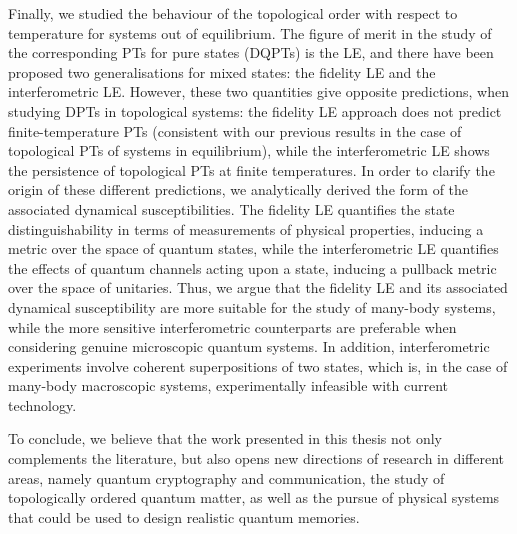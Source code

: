 Finally, we studied the behaviour of the topological order with respect to temperature for systems out of equilibrium. The figure of merit in the study of the corresponding PTs for pure states (DQPTs) is the LE, and there have been proposed two generalisations for mixed states: the fidelity LE and the interferometric LE. However, these two quantities give opposite predictions, when studying DPTs in topological systems: the fidelity LE approach does not predict finite-temperature PTs (consistent with our previous results in the case of topological PTs of systems in equilibrium), while the interferometric LE shows the persistence of topological PTs at finite temperatures.
In order to clarify the origin of these different predictions, we analytically derived the form of the associated dynamical susceptibilities. 
The fidelity LE quantifies the state distinguishability in terms of measurements of physical properties, inducing a metric over the space of quantum states, while the interferometric LE quantifies the effects of quantum channels acting upon a state, inducing a pullback metric over the space of unitaries. Thus, we argue that the fidelity LE and its associated dynamical susceptibility are more suitable for the study of many-body systems, while the more sensitive interferometric counterparts are preferable when considering genuine microscopic quantum systems. In addition, interferometric experiments involve coherent superpositions of two states, which is, in the case of many-body macroscopic systems, experimentally infeasible with current technology.

To conclude, we believe that the work presented in this thesis not only complements the literature, but also opens new directions of research in different areas, namely quantum cryptography and communication, the study of topologically ordered quantum matter, as well as the pursue of physical systems that could be used to design realistic quantum memories.
%
%
%
%
%

